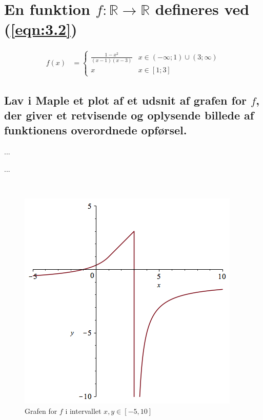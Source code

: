 \documentclass[11pt,a4paper]{article}
\newcommand{\eqnref}[1]{(\ref{eqn:#1})}
\begin{document}
\section
{
    \mdseries
    En funktion $f : \mathbb{R} \rightarrow \mathbb{R}$ defineres ved
    \eqnref{3.2}
}
\begin{align}
    f(x) &=
    \begin{cases}
        \frac{1 - x^2}{(x -1)(x - 3)} &x \in (-\infty;1) \cup (3;\infty) \\
        x &x \in [1;3]
    \end{cases}
    \label{eqn:3.2}
\end{align}

\subsection
{
    \mdseries
    Lav i Maple et plot af et udsnit af grafen for $f$, der giver et
    retvisende og oplysende billede af funktionens overordnede opførsel.
}
...
\begin{multicols}{2}
    ...

    \vfill{\ }\columnbreak

    \begin{figure}[H]
        \includegraphics[scale=0.5]{figures/3-2a-1.png}
        \caption{Grafen for $f$ i intervallet $x,y \in [-5,10]$}
        \label{fig:3.2a-1}
    \end{figure}

\end{multicols}
\end{document}
